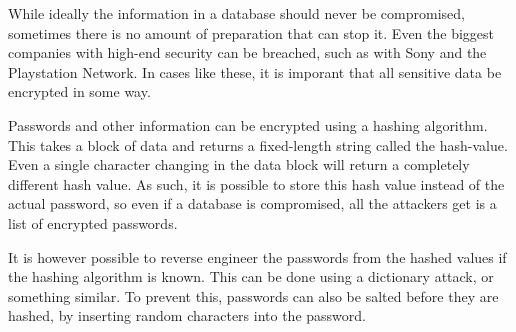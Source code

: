\documentclass[11pt, twocolumn]{article}
\begin{document}
While ideally the information in a database should never be compromised, sometimes there is no amount of preparation that can stop it. Even the biggest companies with high-end security can be breached, such as with Sony and the Playstation Network.\cite{sony} In cases like these, it is imporant that all sensitive data be encrypted in some way.

Passwords and other information can be encrypted using a hashing algorithm. This takes a block of data and returns a fixed-length string called the hash-value. Even a single character changing in the data block will return a completely different hash value. As such, it is possible to store this hash value instead of the actual password, so even if a database is compromised, all the attackers get is a list of encrypted passwords.

It is however possible to reverse engineer the passwords from the hashed values if the hashing algorithm is known. This can be done using a dictionary attack, or something similar. To prevent this, passwords can also be salted before they are hashed, by inserting random characters into the password.\cite{salt}
\end{document}
